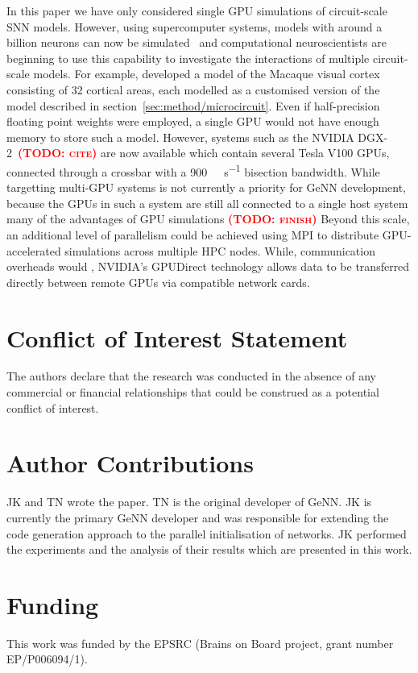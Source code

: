 \documentclass[utf8]{frontiersSCNS} %
\newcommand{\todo}[1]{\textbf{\textsc{\textcolor{red}{(TODO: #1)}}}}
\begin{document}
In this paper we have only considered single GPU simulations of circuit-scale SNN models.
However, using supercomputer systems, models with around a billion neurons can now be simulated~\citep{Jordan2018} and computational neuroscientists are beginning to use this capability to investigate the interactions of multiple circuit-scale models.
For example, \citet{Schmidt2015} developed a model of the Macaque visual cortex consisting of 32 cortical areas, each modelled as a customised version of the model described in section~\ref{sec:method/microcircuit}.
Even if half-precision floating point weights were employed, a single GPU would not have enough memory to store such a model.
However, systems such as the NVIDIA DGX-2~\todo{cite} are now available which contain several Tesla V100 GPUs, connected through a crossbar with a \SI{900}{\giga\byte\per\second} bisection bandwidth.
While targetting multi-GPU systems is not currently a priority for GeNN development, because the GPUs in such a system are still all connected to a single host system many of the advantages of GPU simulations \todo{finish}
Beyond this scale, an additional level of parallelism could be achieved using MPI to distribute GPU-accelerated simulations across multiple HPC nodes.
While, communication overheads would , NVIDIA's GPUDirect technology allows data to be transferred directly between remote GPUs via compatible network cards.

\section*{Conflict of Interest Statement}
The authors declare that the research was conducted in the absence of any commercial or financial relationships that could be construed as a potential conflict of interest.

\section*{Author Contributions}
JK and TN wrote the paper.
TN is the original developer of GeNN.
JK is currently the primary GeNN developer and was responsible for extending the code generation approach to the parallel initialisation of networks.
JK performed the experiments and the analysis of their results which are presented in this work.

\section*{Funding}
This work was funded by the EPSRC (Brains on Board project, grant number EP/P006094/1).
\end{document}
